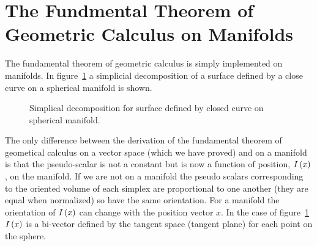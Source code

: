 \section{The Fundmental Theorem of Geometric Calculus on Manifolds}
The fundamental theorem of geometric calculus is simply implemented on manifolds.  In figure~\ref{fig5_2} a 
simplicial decomposition of a surface defined by a close curve on a spherical manifold is shown.
\begin{figure}[htbp]
\begin{center}
\caption{Simplical decomposition for surface defined by closed curve on spherical manifold.}\label{fig5_2}
\end{center}
\end{figure} 
The only difference between the derivation of the fundamental theorem of geometical calculus on a vector space 
(which we have proved) and on a manifold is that the pseudo-scalar is not a constant but is now a function of 
position, ${I}\left ( {x} \right )$, on the manifold.  If we are not on a manifold the pseudo scalars corresponding to the 
oriented volume of each simplex are proportional to one another (they are equal when normalized) so have the
same orientation.  For a manifold the orientation of ${I}\left ( {x} \right )$ can change with the position vector $x$.  
In the case of figure~\ref{fig5_2} ${I}\left ( {x} \right )$ is a bi-vector defined by
the tangent space (tangent plane) for each point on the sphere.

